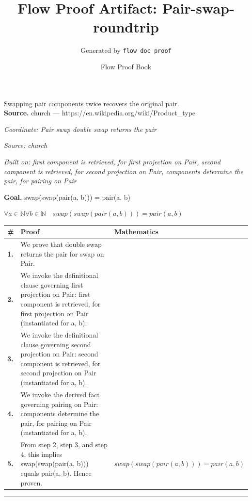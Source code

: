 \documentclass[11pt]{article}
\title{Flow Proof Artifact: Pair-swap-roundtrip}
\author{Generated by \texttt{flow doc proof}}
\date{Flow Proof Book}
\theoremstyle{definition}
\begin{document}
\maketitle
Swapping pair components twice recovers the original pair.\\[0.5em]
\textbf{Source.} church — https://en.wikipedia.org/wiki/Product\_type\\[0.5em]
\bigskip
{}\par
\smallskip\noindent\textit{Coordinate: Pair \cdot swap \cdot double swap returns the pair}\par
\smallskip\noindent\textit{Source: church}\par
\smallskip\noindent\textit{Built on: first component is retrieved, for first projection on Pair, second component is retrieved, for second projection on Pair, components determine the pair, for pairing on Pair}\par
\medskip
\noindent\textbf{Goal.} swap(swap(pair(a, b))) = pair(a, b)\par
\noindent$\displaystyle \forall a \in \mathbb{N} \forall b \in \mathbb{N}\quad swap(swap(pair(a, b))) = pair(a, b)$\par
\medskip
\noindent
\begin{tabular}{@{} >{\raggedright\arraybackslash}p{} >{\raggedright\arraybackslash}p{} >{\raggedleft\arraybackslash}p{} @{}}
\textbf{\#} & \textbf{Proof} & \textbf{Mathematics} \\
\midrule
\textbf{1.} & We prove that double swap returns the pair for swap on Pair. & \\[0.45em]
\textbf{2.} & We invoke the definitional clause governing first projection on Pair: first component is retrieved, for first projection on Pair (instantiated for a, b). & \\[0.45em]
\textbf{3.} & We invoke the definitional clause governing second projection on Pair: second component is retrieved, for second projection on Pair (instantiated for a, b). & \\[0.45em]
\textbf{4.} & We invoke the derived fact governing pairing on Pair: components determine the pair, for pairing on Pair (instantiated for a, b). & \\[0.45em]
\textbf{5.} & From step 2, step 3, and step 4, this implies swap(swap(pair(a, b))) equals pair(a, b). Hence proven. & $\displaystyle swap(swap(pair(a, b))) = pair(a, b)$ \\[0.45em]
\bottomrule
\end{tabular}
\label{thm:Pair-swap-double_swap_returns_the_pair}
\par\medskip\hrule
\end{document}
